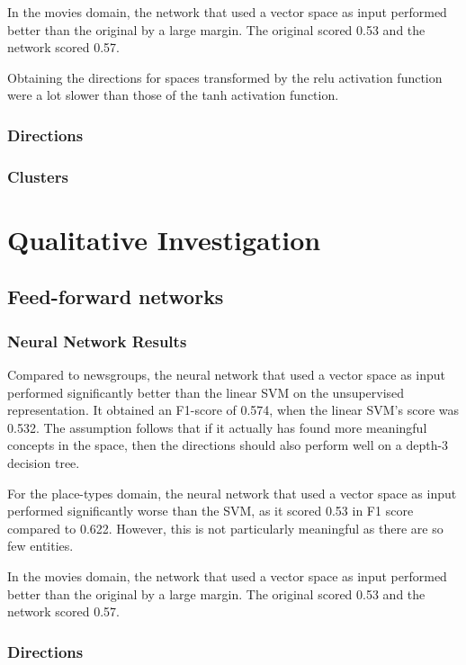 In the movies domain, the network that used a vector space as input performed better than the original by a large margin. The original scored 0.53 and the network scored 0.57.

Obtaining the directions for spaces transformed by the relu activation function were a lot slower than those of the tanh activation function.


\subsubsection{Directions}


\subsubsection{Clusters}

\section{Qualitative Investigation}\label{ch5:qual}

\subsection{Feed-forward networks}

\subsubsection{Neural Network Results}

Compared to newsgroups, the neural network that used a vector space as input performed significantly better than the linear SVM on the unsupervised representation. It obtained an F1-score of 0.574, when the linear SVM's score was 0.532. The assumption follows that if it actually has found more meaningful concepts in the space, then the directions should also perform well on a depth-3 decision tree.

For the place-types domain, the neural network that used a vector space as input performed significantly worse than the SVM, as it scored 0.53 in F1 score compared to 0.622. However, this is not particularly meaningful as there are so few entities.

In the movies domain, the network that used a vector space as input performed better than the original by a large margin. The original scored 0.53 and the network scored 0.57.

 


\subsubsection{Directions}

